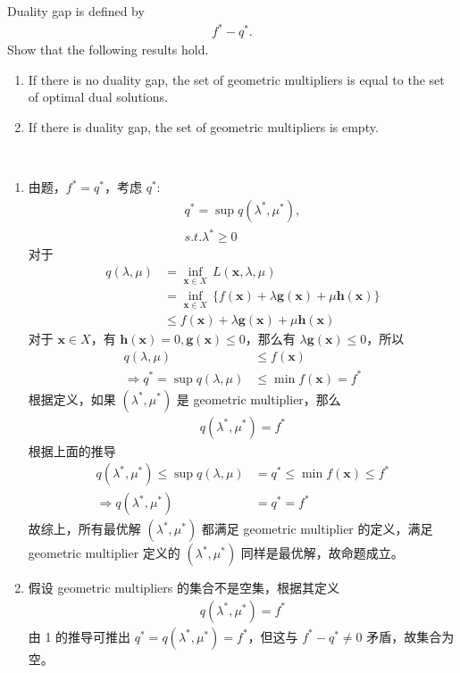 \documentclass[11pt,letter,notitlepage]{article}
\begin{document}
\newpage
\begin{exercise}
Duality gap is defined by
	\begin{align*}
		f^*-q^*.
	\end{align*}
	Show that the following results hold.
	\begin{enumerate}
		\item If there is no duality gap, the set of geometric multipliers is equal to the set of optimal dual solutions.
		\item If there is duality gap, the set of geometric multipliers is empty.
	\end{enumerate}
\end{exercise}

\begin{solution}
	\heiti
	\ \\
	\begin{enumerate}
		\item 由题，$f^* = q^*$，考虑 $q^*$:
		\begin{align*}
			q^* = \sup q(\lambda^*,\mu^*),\\
			s.t. \lambda^* \geq 0
		\end{align*}
		对于
		\begin{align*}
			q(\lambda,\mu) &= \inf_{\mathbf{x}\in X}\, L(\mathbf{x},\lambda,\mu)\\
			&= \inf_{\mathbf{x}\in X}\, \{f(\mathbf{x}) + \lambda \mathbf{g}(\mathbf{x}) + \mu \mathbf{h}(\mathbf{x})\}\\
			&\leqslant f(\mathbf{x}) + \lambda \mathbf{g}(\mathbf{x}) + \mu \mathbf{h}(\mathbf{x})
		\end{align*}
		对于 $\mathbf{x} \in X$，有 $\mathbf{h}(\mathbf{x}) = 0, \mathbf{g}(\mathbf{x}) \leqslant 0$，那么有 $\lambda\mathbf{g}(\mathbf{x}) \leqslant 0$，所以
		\begin{align*}
			q(\lambda,\mu) &\leqslant  f(\mathbf{x})\\
			\Rightarrow q^* =  \sup q(\lambda,\mu) &\leqslant \min f(\mathbf{x}) = f^*
		\end{align*}
		根据定义，如果 $(\lambda^*,\mu^*)$ 是 geometric multiplier，那么
		\begin{align*}
			q(\lambda^*,\mu^*) = f^*
		\end{align*}
		根据上面的推导
		\begin{align*}
			q(\lambda^*,\mu^*) \leqslant \sup q(\lambda,\mu) &= q^* \leqslant \min f(\mathbf{x})  \leqslant f^*\\
			\Rightarrow q(\lambda^*,\mu^*) &= q^* = f^*
		\end{align*}
		故综上，所有最优解 $(\lambda^*,\mu^*)$ 都满足 geometric multiplier 的定义，满足 geometric multiplier 定义的 $(\lambda^*,\mu^*)$ 同样是最优解，故命题成立。
		\item 假设 geometric multipliers 的集合不是空集，根据其定义
		\begin{align*}
			q(\lambda^*,\mu^*) = f^*
		\end{align*}
		由 1 的推导可推出 $q^* = q(\lambda^*,\mu^*) = f^*$，但这与 $f^* - q^* \neq 0$ 矛盾，故集合为空。
	\end{enumerate}
\end{solution}
\end{document}
